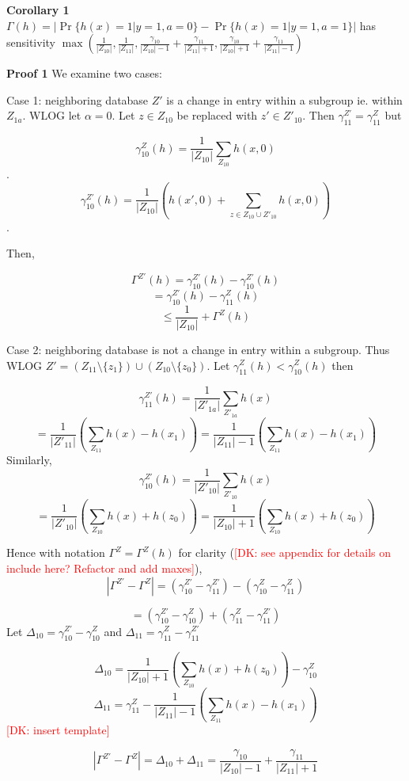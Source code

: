 \documentclass[format = sigconf]{acmart}
\newcommand{\dk}[1]{\textcolor{red}{[DK: #1]}}
\newcommand{\1}{\mathbbm{1}}
\theoremstyle{definition}
\begin{document}
{\bf Corollary 1} $\Gamma(h) = |\Pr\{h(x) = 1 | y=1, a =0\} - \Pr\{h(x) = 1 | y = 1, a = 1\}|$ has sensitivity $\max(\frac{1}{|Z_{10}|},\frac{1}{|Z_{11}|}, \frac{\gamma_{10}}{|Z_{10}|-1} + \frac{\gamma_{11}}{|Z_{11}|+1}, \frac{\gamma_{10}}{|Z_{10}|+1} + \frac{\gamma_{11}}{|Z_{11}|-1})$

{\bf Proof 1}
We examine two cases:

Case 1: neighboring database $Z'$ is a change in entry within a subgroup ie. within $Z_{1a}$. WLOG let $\alpha = 0$. Let $z \in Z_{10}$ be replaced with $z' \in Z'_{10}$. Then $\gamma^{Z'}_{11} = \gamma^Z_{11}$ but

$$\gamma_{10}^Z(h) = \frac{1}{|Z_{10}|} \sum_{Z_{10}} h(x,0)$$.
$$\gamma_{10}^{Z'}(h) = \frac{1}{|Z_{10}|} (h(x', 0) +\sum_{z \in Z_{10} \cup Z'_{10}} h(x, 0))$$.

Then,

$$ \Gamma^{Z'}(h) = \gamma_{10}^{Z'}(h) - \gamma_{10}^{Z'}(h) $$
$$ = \gamma_{10}^{Z'}(h) - \gamma^Z_{11}(h) $$
$$ \leq \frac{1}{|Z_{10}|}  + \Gamma^{Z}(h) $$


Case 2: neighboring database is not a change in entry within a subgroup. Thus WLOG $Z' =(Z_{11}\setminus \{z_1\} )\cup( Z_{10}\setminus \{z_0\})$. Let $\gamma_{11}^{Z}(h) <\gamma_{10}^{Z}(h)$ then

$$\gamma_{11}^{Z'}(h) = \frac{1}{|Z'_{1a}|} \sum_{Z'_{1a}} h(x)$$
$$= \frac{1}{|Z'_{11}|} (\sum_{Z_{11}} h(x)-h(x_1)) = \frac{1}{|Z_{11}|-1} (\sum_{Z_{11}} h(x)-h(x_1))$$
Similarly,
$$\gamma_{10}^{Z'}(h) = \frac{1}{|Z'_{10}|} \sum_{Z'_{10}} h(x)$$
$$ = \frac{1}{|Z'_{10}|} (\sum_{Z_{10}} h(x)+h(z_0))= \frac{1}{|Z_{10}|+1} (\sum_{Z_{10}} h(x)+h(z_0))$$

Hence with notation $ \Gamma^Z = \Gamma^Z(h)$ for clarity (\dk{see appendix for details on include here? Refactor and add maxes}), $$|\Gamma^{Z'}- \Gamma^{Z}| = (\gamma_{10}^{Z'} - \gamma_{11}^{Z'}) - (\gamma_{10}^{Z} - \gamma_{11}^{Z})$$


$$=(\gamma_{10}^{Z'}- \gamma_{10}^{Z}) + (\gamma_{11}^{Z} -\gamma_{11}^{Z'})$$
Let $\Delta_{10}= \gamma_{10}^{Z'}- \gamma_{10}^{Z}$ and  $\Delta_{11} = \gamma_{11}^{Z} -\gamma_{11}^{Z'}$

$$\Delta_{10} = \frac{1}{|Z_{10}|+1} (\sum_{Z_{10}} h(x)+h(z_0)) - \gamma_{10}^{Z}$$
$$\Delta_{11} = \gamma_{11}^{Z}- \frac{1}{|Z_{11}|-1} (\sum_{Z_{11}} h(x)-h(x_1))$$
\dk {insert template}

$$|\Gamma^{Z'}- \Gamma^{Z}| = \Delta_{10} + \Delta_{11}= \frac{\gamma_{10}}{|Z_{10}|-1} + \frac{\gamma_{11}}{|Z_{11}|+1} $$
\end{document}
